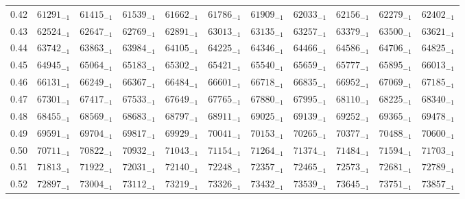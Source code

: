 \documentclass[10pt, a4paper]{article}
\begin{document}
\begin{center}
\begin{longtable}{c | c c c c c | c c c c c}
        0.42 & \({61291}_{-1}\) & \({61415}_{-1}\) & \({61539}_{-1}\) & \({61662}_{-1}\) & \({61786}_{-1}\) & \({61909}_{-1}\) & \({62033}_{-1}\) & \({62156}_{-1}\) & \({62279}_{-1}\) & \({62402}_{-1}\)\\
        0.43 & \({62524}_{-1}\) & \({62647}_{-1}\) & \({62769}_{-1}\) & \({62891}_{-1}\) & \({63013}_{-1}\) & \({63135}_{-1}\) & \({63257}_{-1}\) & \({63379}_{-1}\) & \({63500}_{-1}\) & \({63621}_{-1}\)\\
        0.44 & \({63742}_{-1}\) & \({63863}_{-1}\) & \({63984}_{-1}\) & \({64105}_{-1}\) & \({64225}_{-1}\) & \({64346}_{-1}\) & \({64466}_{-1}\) & \({64586}_{-1}\) & \({64706}_{-1}\) & \({64825}_{-1}\)\\
        0.45 & \({64945}_{-1}\) & \({65064}_{-1}\) & \({65183}_{-1}\) & \({65302}_{-1}\) & \({65421}_{-1}\) & \({65540}_{-1}\) & \({65659}_{-1}\) & \({65777}_{-1}\) & \({65895}_{-1}\) & \({66013}_{-1}\)\\
        0.46 & \({66131}_{-1}\) & \({66249}_{-1}\) & \({66367}_{-1}\) & \({66484}_{-1}\) & \({66601}_{-1}\) & \({66718}_{-1}\) & \({66835}_{-1}\) & \({66952}_{-1}\) & \({67069}_{-1}\) & \({67185}_{-1}\)\\
        0.47 & \({67301}_{-1}\) & \({67417}_{-1}\) & \({67533}_{-1}\) & \({67649}_{-1}\) & \({67765}_{-1}\) & \({67880}_{-1}\) & \({67995}_{-1}\) & \({68110}_{-1}\) & \({68225}_{-1}\) & \({68340}_{-1}\)\\
        0.48 & \({68455}_{-1}\) & \({68569}_{-1}\) & \({68683}_{-1}\) & \({68797}_{-1}\) & \({68911}_{-1}\) & \({69025}_{-1}\) & \({69139}_{-1}\) & \({69252}_{-1}\) & \({69365}_{-1}\) & \({69478}_{-1}\)\\
        0.49 & \({69591}_{-1}\) & \({69704}_{-1}\) & \({69817}_{-1}\) & \({69929}_{-1}\) & \({70041}_{-1}\) & \({70153}_{-1}\) & \({70265}_{-1}\) & \({70377}_{-1}\) & \({70488}_{-1}\) & \({70600}_{-1}\)\\
        0.50 & \({70711}_{-1}\) & \({70822}_{-1}\) & \({70932}_{-1}\) & \({71043}_{-1}\) & \({71154}_{-1}\) & \({71264}_{-1}\) & \({71374}_{-1}\) & \({71484}_{-1}\) & \({71594}_{-1}\) & \({71703}_{-1}\)\\
        0.51 & \({71813}_{-1}\) & \({71922}_{-1}\) & \({72031}_{-1}\) & \({72140}_{-1}\) & \({72248}_{-1}\) & \({72357}_{-1}\) & \({72465}_{-1}\) & \({72573}_{-1}\) & \({72681}_{-1}\) & \({72789}_{-1}\)\\
        0.52 & \({72897}_{-1}\) & \({73004}_{-1}\) & \({73112}_{-1}\) & \({73219}_{-1}\) & \({73326}_{-1}\) & \({73432}_{-1}\) & \({73539}_{-1}\) & \({73645}_{-1}\) & \({73751}_{-1}\) & \({73857}_{-1}\)\\

\end{longtable}
\end{center}
\end{document}
